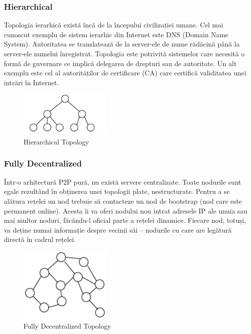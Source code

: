\subsubsection{Hierarchical}

Topologia ierarhică există încă de la începului civilizației umane. Cel mai
cunoscut exemplu de sistem ierarhic din Internet este DNS (Domain Name
System). Autoritatea se translatează de la server-ele de nume rădăcină până la
server-ele numelui înregistrat. Topologia este potrivită sistemelor care
necesită o formă de guvernare ce implică delegarea de drepturi sau de
autoritate. Un alt exemplu este cel al autorităților de certificare (CA) care
certifică validitatea unei intrări în Internet.

\begin{figure}
  \centering
  \includegraphics[width=0.4\textwidth]{src/img/p2p-systems/hierarchical}
  \caption{Hierarchical Topology}
  \label{fig:p2p-systems:hierarchical}
\end{figure}

\subsubsection{Fully Decentralized}

Într-o arhitectură P2P pură, nu există servere centralizate. Toate nodurile
sunt egale rezultând în obținerea unei topologii plate, nestructurate. Pentru
a se alătura rețelei un nod trebuie să contacteze un nod de bootstrap (nod
care este permanent online). Acesta îi va oferi nodului nou intrat adresele IP
ale unuia sau mai multor noduri, făcându-l oficial parte a rețelei dinamice.
Fiecare nod, totuși, va deține numai informație despre vecinii săi – nodurile
cu care are legătură directă în cadrul rețelei.

\begin{figure}
  \centering
  \includegraphics[width=0.4\textwidth]{src/img/p2p-systems/decentralized}
  \caption{Fully Decentralized Topology}
  \label{fig:p2p-systems:decentralized}
\end{figure}

